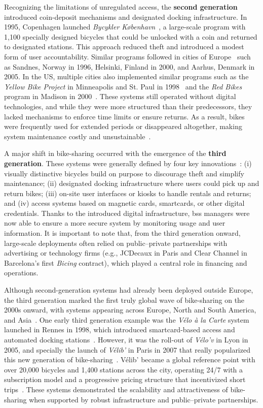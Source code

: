 Recognizing the limitations of unregulated access, the \textbf{second generation} introduced coin-deposit mechanisms and designated docking infrastructure. In 1995, Copenhagen launched \textit{Bycykler København}~\cite{Walker2018}, a large-scale program with 1,100 specially designed bicycles that could be unlocked with a coin and returned to designated stations. This approach reduced theft and introduced a modest form of user accountability. Similar programs followed in cities of Europe~\cite{Shaheen2010} such as Sandnes, Norway in 1996, Helsinki, Finland in 2000, and Aarhus, Denmark in 2005. In the US, multiple cities also implemented similar programs such as the \textit{Yellow Bike Project} in Minneapolis and St. Paul in 1998~\cite{Shaheen2010} and the \textit{Red Bikes} program in Madison in 2000~\cite{Charly2012}. These systems still operated without digital technologies, and while they were more structured than their predecessors, they lacked mechanisms to enforce time limits or ensure returns. As a result, bikes were frequently used for extended periods or disappeared altogether, making system maintenance costly and unsustainable~\cite{Shaheen2010, Medard2019}.

A major shift in bike-sharing occurred with the emergence of the \textbf{third generation}. These systems were generally defined by four key innovations~\cite{Shaheen2010}: (i) visually distinctive bicycles build on purpose to discourage theft and simplify maintenance; (ii) designated docking infrastructure where users could pick up and return bikes; (iii) on-site user interfaces or kiosks to handle rentals and returns; and (iv) access systems based on magnetic cards, smartcards, or other digital credentials. Thanks to the introduced digital infrastructure, \ac{bss} managers were now able to ensure a more secure system by monitoring usage and user information. It is important to note that, from the third generation onward, large-scale deployments often relied on public–private partnerships with advertising or technology firms (e.g., JCDecaux in Paris and Clear Channel in Barcelona’s first \textit{Bicing} contract), which played a central role in financing and operations.

Although second-generation systems had already been deployed outside Europe, the third generation marked the first truly global wave of bike-sharing on the 2000s onward, with systems appearing across Europe, North and South America, and Asia~\cite{Shaheen2010}. One early third generation example was the \textit{Vélo à la Carte} system launched in Rennes in 1998, which introduced smartcard-based access and automated docking stations~\cite{DeMaio2009}. However, it was the roll-out of \textit{Vélo’v} in Lyon in 2005, and specially the launch of \textit{Vélib’} in Paris in 2007 that really popularized this new generation of bike-sharing~\cite{DeMaio2009}. Vélib’ became a global reference point with over 20,000 bicycles and 1,400 stations across the city, operating 24/7 with a subscription model and a progressive pricing structure that incentivized short trips~\cite{Shaheen2010}. These systems demonstrated the scalability and attractiveness of bike-sharing when supported by robust infrastructure and public–private partnerships.

